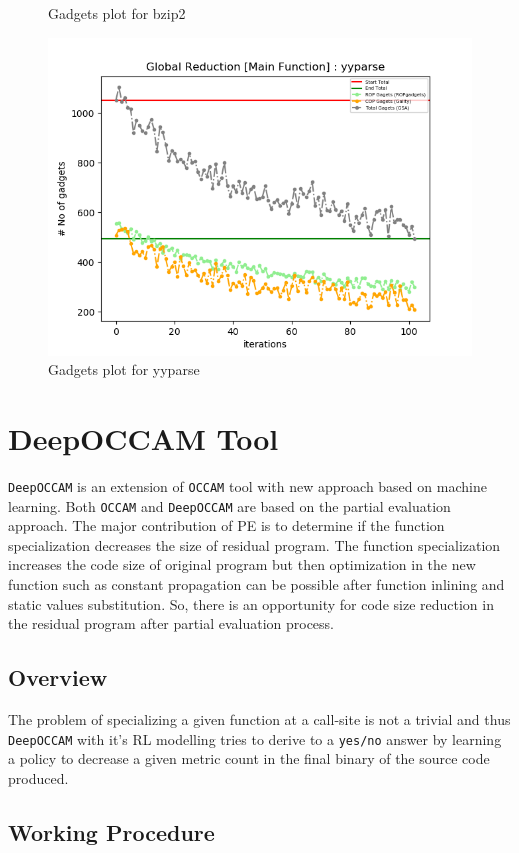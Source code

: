 \documentclass{relatorio}
\begin{document}
\begin{figure}[H]
	\caption{Gadgets plot for \color{blue} bzip2}%
	\label{fig:plant}
	\centering
	\captionsetup{justification=centering}
	\includegraphics[width=0.65\linewidth]{imgs/chisel_gadgets_yyparse_plot.png}
	\caption{Gadgets plot for \color{blue} yyparse}%
	\label{fig:plant}
\end{figure}

\section{DeepOCCAM Tool}%

\texttt{DeepOCCAM} is an extension of \texttt{OCCAM} tool with new approach based on machine learning. Both \texttt{OCCAM} and \texttt{DeepOCCAM} are based on the partial evaluation approach.
The major contribution of PE is to determine if the function specialization decreases the size of residual program. The function specialization increases the code
size of original program but then optimization in the new function  such as constant propagation can be possible after function inlining and static values substitution. So, there is an opportunity for code size reduction in the residual program after partial evaluation process. 

\subsection{Overview}%

The problem of specializing a given function at a call-site is not a trivial and thus \texttt{DeepOCCAM} with it's RL modelling tries to derive to a \texttt{yes/no} answer by learning a policy to decrease a given metric count in the final binary of the source code produced. 

\subsection{Working Procedure}%
\end{document}
